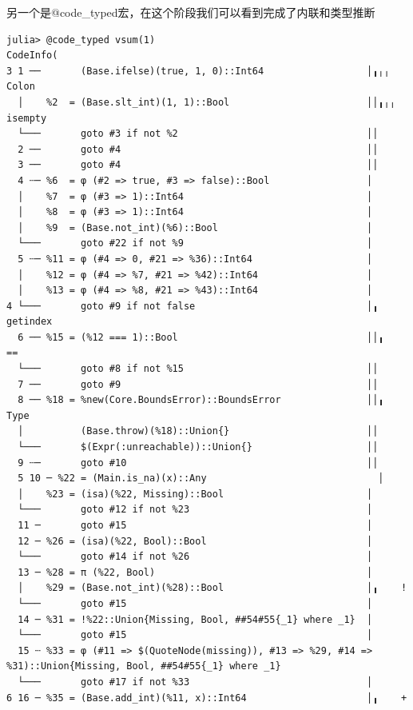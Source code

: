 另一个是@code\_typed宏，在这个阶段我们可以看到完成了内联和类型推断
\begin{lstlisting}
julia> @code_typed vsum(1)
CodeInfo(
3 1 ──       (Base.ifelse)(true, 1, 0)::Int64                  │╻╷╷  Colon
  │    %2  = (Base.slt_int)(1, 1)::Bool                        ││╻╷╷  isempty
  └───       goto #3 if not %2                                 ││   
  2 ──       goto #4                                           ││   
  3 ──       goto #4                                           ││   
  4 ┄─ %6  = φ (#2 => true, #3 => false)::Bool                 │    
  │    %7  = φ (#3 => 1)::Int64                                │    
  │    %8  = φ (#3 => 1)::Int64                                │    
  │    %9  = (Base.not_int)(%6)::Bool                          │    
  └───       goto #22 if not %9                                │    
  5 ┄─ %11 = φ (#4 => 0, #21 => %36)::Int64                    │    
  │    %12 = φ (#4 => %7, #21 => %42)::Int64                   │    
  │    %13 = φ (#4 => %8, #21 => %43)::Int64                   │    
4 └───       goto #9 if not false                              │╻    getindex
  6 ── %15 = (%12 === 1)::Bool                                 ││╻    ==
  └───       goto #8 if not %15                                ││   
  7 ──       goto #9                                           ││   
  8 ── %18 = %new(Core.BoundsError)::BoundsError               ││╻    Type
  │          (Base.throw)(%18)::Union{}                        ││   
  └───       $(Expr(:unreachable))::Union{}                    ││   
  9 ┄─       goto #10                                          ││   
  5 10 ─ %22 = (Main.is_na)(x)::Any                              │    
  │    %23 = (isa)(%22, Missing)::Bool                         │    
  └───       goto #12 if not %23                               │    
  11 ─       goto #15                                          │    
  12 ─ %26 = (isa)(%22, Bool)::Bool                            │    
  └───       goto #14 if not %26                               │    
  13 ─ %28 = π (%22, Bool)                                     │    
  │    %29 = (Base.not_int)(%28)::Bool                         │╻    !
  └───       goto #15                                          │    
  14 ─ %31 = !%22::Union{Missing, Bool, ##54#55{_1} where _1}  │    
  └───       goto #15                                          │    
  15 ┄ %33 = φ (#11 => $(QuoteNode(missing)), #13 => %29, #14 => %31)::Union{Missing, Bool, ##54#55{_1} where _1}
  └───       goto #17 if not %33                               │    
6 16 ─ %35 = (Base.add_int)(%11, x)::Int64                     │╻    +

\end{lstlisting}
